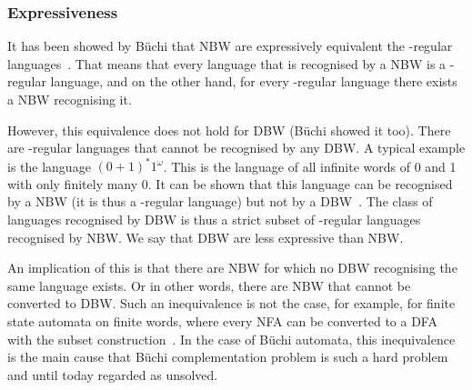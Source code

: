 \subsubsection{Expressiveness}
It has been showed by Büchi that NBW are expressively equivalent the \om-regular languages~\cite{buchi1960decision}. That means that every language that is recognised by a NBW is a \om-regular language, and on the other hand, for every \om-regular language there exists a NBW recognising it.

However, this equivalence does not hold for DBW (Büchi showed it too). There are \om-regular languages that cannot be recognised by any DBW. A typical example is the language $(0+1)^*1^\omega$. This is the language of all infinite words of 0 and 1 with only finitely many 0. It can be shown that this language can be recognised by a NBW (it is thus a \om-regular language) but not by a DBW~\cite{1996_vardi}\cite{2002_roggenbach}. The class of languages recognised by DBW is thus a strict subset of \om-regular languages recognised by NBW. We say that DBW are less expressive than NBW.

An implication of this is that there are NBW for which no DBW recognising the same language exists. Or in other words, there are NBW that cannot be converted to DBW. Such an inequivalence is not the case, for example, for finite state automata on finite words, where every NFA can be converted to a DFA with the subset construction~\cite{hopcroft2006automata}\cite{1959_rabin}. In the case of Büchi automata, this inequivalence is the main cause that Büchi complementation problem is such a hard problem~\cite{niessner1997deterministic} and until today regarded as unsolved. 





